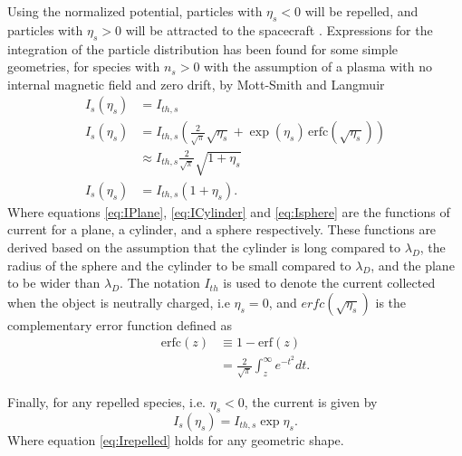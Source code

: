 Using the normalized potential, particles with $\eta_s < 0$ will be repelled, and particles with $\eta_s > 0$ will be attracted to the spacecraft \parencite{Marholm2019}. Expressions for the integration of the particle distribution has been found for some simple geometries, for species with $n_s > 0$ with the assumption of a plasma with no internal magnetic field and zero drift, by Mott-Smith and Langmuir \parencite{Mott-Smith1926}
\begin{subequations}
    \begin{align}
        I_s (\eta_s) &= I_{th,s} \label{eq:IPlane} \\
        I_s (\eta_s) &= I_{th,s} \left(\frac{2}{\sqrt{\pi}} \sqrt{\eta_s} + \exp(\eta_s) \hspace{2pt} \text{erfc}(\sqrt{\eta_s}) \right) \label{eq:ICylinder}\\
        & \approx I_{th,s} \frac{2}{\sqrt{\pi}} \sqrt{1 + \eta_s} \\
        I_s(\eta_s)  &= I_{th,s} (1 + \eta_s). \label{eq:Isphere}
    \end{align}
\end{subequations}
Where equations \eqref{eq:IPlane}, \eqref{eq:ICylinder} and \eqref{eq:Isphere} are the functions of current for a plane, a cylinder, and a sphere respectively. These functions are derived based on the assumption that the cylinder is long compared to $\lambda_D$, the radius of the sphere and the cylinder to be small compared to $\lambda_D$, and the plane to be wider than $\lambda_D$. The notation $I_{th}$ is used to denote the current collected when the object is neutrally charged, i.e $\eta_s = 0$, and $erfc(\sqrt{\eta_s})$ is the complementary error function defined as
\begin{subequations}
    \begin{align*}
        \text{erfc}(z) &\equiv 1 - \text{erf}(z) \\
        &= \frac{2}{\sqrt{\pi}} \int^\infty_z e^{-t^2} dt.
    \end{align*}
\end{subequations}

Finally, for any repelled species, i.e. $\eta_s < 0$, the current is given by
\begin{equation}\label{eq:Irepelled}
    I_s(\eta_s) = I_{th,s} \exp{\eta_s}.
\end{equation}
Where equation \eqref{eq:Irepelled} holds for any geometric shape. 


